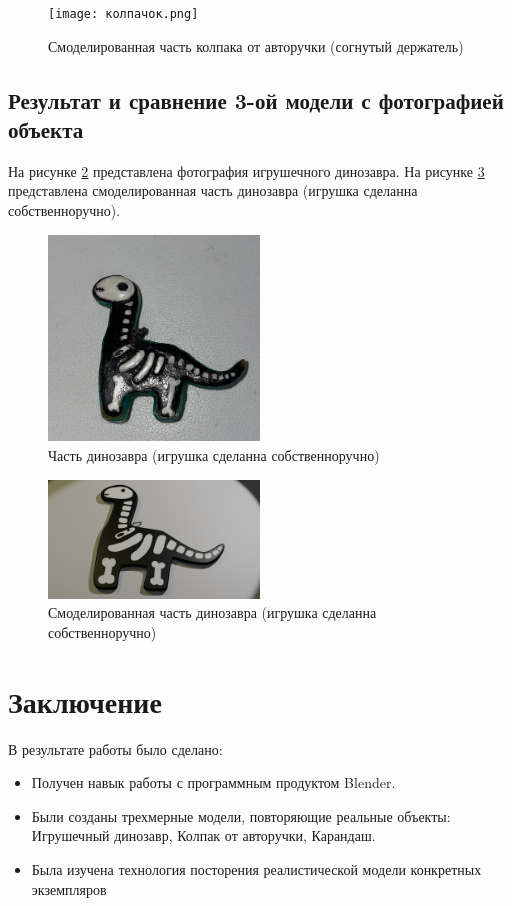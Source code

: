 \documentclass[areasetadvanced]{scrartcl}
\begin{document}
\begin{figure}[H]
    \centering
    \texttt{[image: колпачок.png]}
    \caption{Смоделированная часть колпака от авторучки (согнутый держатель)}
    \label{fig:kolpakModel}
\end{figure}

\subsection{Результат и сравнение 3-ой модели с фотографией объекта}
На рисунке \ref{fig:dinoName} представлена фотография игрушечного динозавра.
На рисунке \ref{fig:dinoModel} представлена смоделированная часть динозавра (игрушка сделанна собственноручно).
\begin{figure}[H]
    \centering
    \includegraphics[width=0.5\textwidth]{DinoFront.png}
    \caption{Часть динозавра (игрушка сделанна собственноручно)}
    \label{fig:dinoName}
\end{figure}

\begin{figure}[H]
    \centering
    \includegraphics[width=0.5\textwidth]{дино.png}
    \caption{Смоделированная часть динозавра (игрушка сделанна собственноручно)}
    \label{fig:dinoModel}
\end{figure}


\newpage
\section*{Заключение}
\par В результате работы было сделано:
\begin{itemize}
    \item Получен навык работы с программным продуктом Blender.
    \item Были созданы трехмерные модели, повторяющие реальные объекты: Игрушечный динозавр, Колпак от авторучки, Карандаш.
    \item Была изучена технология посторения реалистической модели конкретных экземпляров
\end{itemize}
\end{document}
